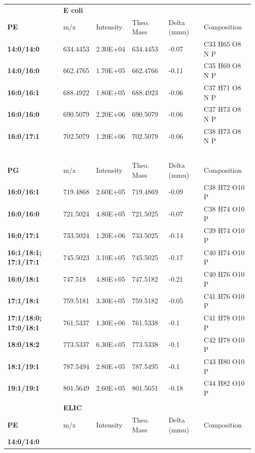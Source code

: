 \documentclass[12pt]{ruthesis_nofloat}
\begin{document}
\begin{longtable}[]{@{}llllll@{}}

& \textbf{E coli} & & & &\\

\textbf{PE} & m/z & Intensity & Theo. Mass & Delta (mmu) &
Composition\\
\textbf{14:0/14:0} & 634.4453 & 2.30E+04 & 634.4453 & -0.07 & C33 H65 O8
N P\\
\textbf{14:0/16:0} & 662.4765 & 1.70E+05 & 662.4766 & -0.11 & C35 H69 O8
N P\\
\textbf{16:0/16:1} & 688.4922 & 1.80E+05 & 688.4923 & -0.06 & C37 H71 O8
N P\\
\textbf{16:0/16:0} & 690.5079 & 2.20E+06 & 690.5079 & -0.06 & C37 H73 O8
N P\\
\textbf{16:0/17:1} & 702.5079 & 1.20E+06 & 702.5079 & -0.06 & C38 H73 O8
N P\\
\textbf{~} & ~ & ~ & ~ & ~ & ~\\
\textbf{PG} & m/z & Intensity & Theo. Mass & Delta (mmu) &
Composition\\
\textbf{16:0/16:1} & 719.4868 & 2.60E+05 & 719.4869 & -0.09 & C38 H72
O10 P\\
\textbf{16:0/16:0} & 721.5024 & 4.80E+05 & 721.5025 & -0.07 & C38 H74
O10 P\\
\textbf{16:0/17:1} & 733.5024 & 1.20E+06 & 733.5025 & -0.14 & C39 H74
O10 P\\
\textbf{16:1/18:1; 17:1/17:1} & 745.5023 & 3.10E+05 & 745.5025 & -0.17 &
C40 H74 O10 P\\
\textbf{16:0/18:1} & 747.518 & 4.80E+05 & 747.5182 & -0.21 & C40 H76 O10
P\\
\textbf{17:1/18:1} & 759.5181 & 3.30E+05 & 759.5182 & -0.05 & C41 H76
O10 P\\
\textbf{17:1/18:0; 17:0/18:1} & 761.5337 & 1.30E+06 & 761.5338 & -0.1 &
C41 H78 O10 P\\
\textbf{18:0/18:2} & 773.5337 & 6.30E+05 & 773.5338 & -0.1 & C42 H78 O10
P\\
\textbf{18:1/19:1} & 787.5494 & 2.80E+05 & 787.5495 & -0.1 & C43 H80 O10
P\\
\textbf{19:1/19:1} & 801.5649 & 2.60E+05 & 801.5651 & -0.18 & C44 H82
O10 P\\
& & & & &\\
& \textbf{ELIC} & ~ & ~ & ~ & ~\\
\textbf{PE} & m/z & Intensity & Theo. Mass & Delta (mmu) &
Composition\\
\textbf{14:0/14:0} & ~ & ~ & ~ & ~ & ~\\

\end{longtable}
\end{document}
